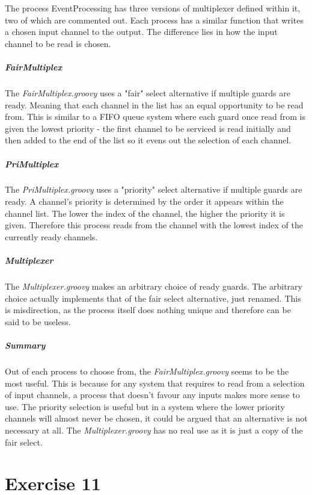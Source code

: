 \documentclass[10pt, a4paper]{article}
\begin{document}
   The process EventProcessing has three versions of multiplexer defined within it, two of which are commented out. Each process has a similar function that writes a chosen input channel to the output. The difference lies in how the input channel to be read is chosen. 
   
   
   \subparagraph{FairMultiplex}
   
   The \textit{FairMultiplex.groovy} uses a "fair" select alternative if multiple guards are ready. Meaning that each channel in the list has an equal opportunity to be read from. This is similar to a FIFO queue system where each guard once read from is given the lowest priority - the first channel to be serviced is read initially and then added to the end of the list so it evens out the selection of each channel.
   
   \subparagraph{PriMultiplex}
   
   The \textit{PriMultiplex.groovy} uses a "priority" select alternative if multiple guards are ready. A channel's priority is determined by the order it appears within the channel list. The lower the index of the channel, the higher the priority it is given. Therefore this process reads from the channel with the lowest index of the currently ready channels.
  
   \subparagraph{Multiplexer}
   
   The \textit{Multiplexer.groovy} makes an arbitrary choice of ready guards. The arbitrary choice actually implements that of the fair select alternative, just renamed. This is misdirection, as the process itself does nothing unique and therefore can be said to be useless.  
   
   \subparagraph{Summary}
   Out of each process to choose from, the \textit{FairMultiplex.groovy} seems to be the most useful. This is because for any system that requires to read from a selection of input channels, a process that doesn't favour any inputs makes more sense to use. The priority selection is useful but in a system where the lower priority channels will almost never be chosen, it could be argued that an alternative is not necessary at all. The \textit{Multiplexer.groovy} has no real use as it is just a copy of the fair select.
   
   \setcounter{section}{11}
   \section*{Exercise 11}
   
\end{document}

